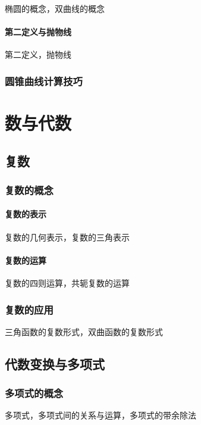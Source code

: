 \documentclass[lang=cn, zihao=4.5]{elegantbook}
\begin{document}
椭圆的概念，双曲线的概念

\subsection{第二定义与抛物线}

第二定义，抛物线

\section{圆锥曲线计算技巧}


\part{数与代数}

\chapter{复数}

\section{复数的概念}

\subsection{复数的表示}

复数的几何表示，复数的三角表示

\subsection{复数的运算}

复数的四则运算，共轭复数的运算

\section{复数的应用}

三角函数的复数形式，双曲函数的复数形式

\chapter{代数变换与多项式}

\section{多项式的概念}

多项式，多项式间的关系与运算，多项式的带余除法
\end{document}
